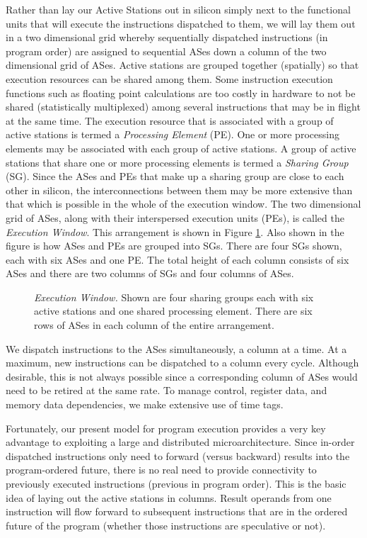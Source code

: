 \documentclass[10pt,dvips]{article}
\begin{document}
Rather than lay our Active Stations out in silicon simply next to
the functional units that will execute the instructions 
dispatched to them,
we will lay them out in a two dimensional grid whereby sequentially
dispatched instructions (in program order) are assigned to 
sequential ASes down a column of
the two dimensional grid of ASes.  
Active stations are grouped together (spatially) so that execution resources
can be shared among them.  Some instruction execution functions such
as floating point calculations are too costly in hardware to not
be shared (statistically multiplexed) among several instructions
that may be in flight at the same time.
The execution resource that is associated with a group of active stations
is termed a \textit{Processing Element} (PE).  One or more processing
elements may be associated with each group of active stations.
A group of active stations that share one or more processing elements
is termed a \textit{Sharing Group} (SG).
Since the ASes and PEs that make up a sharing group are close to each
other in silicon, the interconnections between them may be more
extensive than that which is possible in the whole of the execution window.
The two dimensional
grid of ASes, along with their interspersed execution units (PEs),
is called the {\em Execution Window}.
This arrangement is shown in Figure \ref{fig:window}.  
Also shown
in the figure is how ASes and PEs are grouped into SGs.
There are four SGs shown, each with six ASes and one PE.
The total height of each column consists of six ASes and there
are two columns of SGs and four columns of ASes.
%
\begin{figure}
\centering
{}
\caption{{\em Execution Window.} Shown are four sharing groups
each with six active stations and one shared processing element.
There are six rows of ASes in each column of the entire arrangement.}
\label{fig:window}
\end{figure}
%
We dispatch instructions to the ASes simultaneously, a column at
a time.  At a maximum, new instructions can be dispatched to a column every
cycle.  Although desirable, this is not always possible since a
corresponding column of ASes would need to be retired at the same rate.
To manage control, register data, and memory
data dependencies, we make extensive use of time tags.

Fortunately, our present model for program execution provides
a very key advantage to exploiting a large and distributed microarchitecture.
Since in-order dispatched instructions 
only need to forward (versus backward) results into the
program-ordered future, there is no real need to provide connectivity
to previously executed instructions 
(previous in program order).  This is the basic
idea of laying out the active stations in columns.  Result operands
from one instruction will flow forward to subsequent instructions
that are in the ordered future of the program (whether those
instructions are speculative or not).  
%
%
\end{document}

